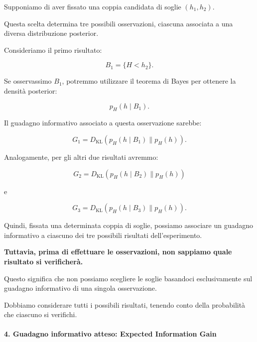 Supponiamo di aver fissato una coppia candidata di soglie $(h_1,h_2)$.

Questa scelta determina tre possibili osservazioni, ciascuna associata a una diversa distribuzione posterior.

Consideriamo il primo risultato:

\begin{equation*}
    B_1=\{H<h_2\}.
\end{equation*}

Se osservassimo $B_1$, potremmo utilizzare il teorema di Bayes per ottenere la densità posterior:

\begin{equation*}
    p_H(h\mid B_1).
\end{equation*}

Il guadagno informativo associato a questa osservazione sarebbe:

\begin{equation*}
    G_1
    =
    D_{\mathrm{KL}}
    \left(
        p_H(h \mid B_1)
        \|
        p_H(h)
    \right).
\end{equation*}

Analogamente, per gli altri due risultati avremmo:

\begin{equation*}
    G_2
    =
    D_{\mathrm{KL}}
    \left(
        p_H(h \mid B_2)
        \|
        p_H(h)
    \right)
\end{equation*}

e

\begin{equation*}
    G_3
    =
    D_{\mathrm{KL}}
    \left(
        p_H(h \mid B_3)
        \|
        p_H(h)
    \right).
\end{equation*}

Quindi, fissata una determinata coppia di soglie, possiamo associare un guadagno informativo a ciascuno dei tre possibili risultati dell'esperimento.

\textbf{Tuttavia, prima di effettuare le osservazioni, non sappiamo quale risultato si verificherà.}

Questo significa che non possiamo scegliere le soglie basandoci esclusivamente sul guadagno informativo di una singola osservazione.

Dobbiamo considerare tutti i possibili risultati, tenendo conto della probabilità che ciascuno si verifichi.

\paragraph{4. Guadagno informativo atteso: Expected Information Gain}

